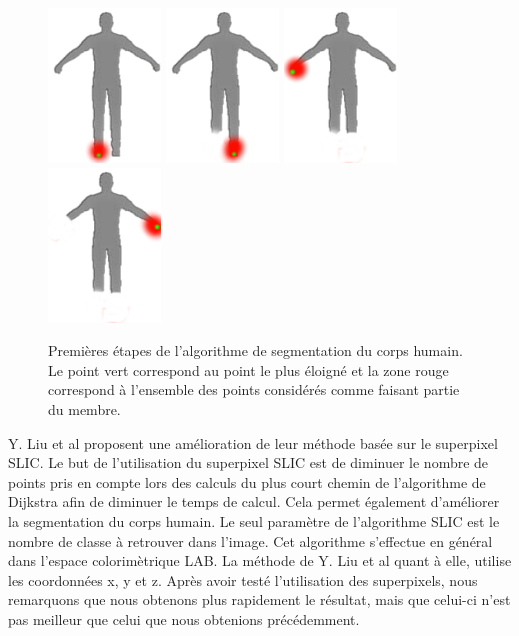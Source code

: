 \begin{figure}[!ht]
  \begin{center}
    \includegraphics[width=3cm]{image/humanFootR.png}
    \includegraphics[width=3cm]{image/humanFootL.png}
    \includegraphics[width=3cm]{image/humanHandR.png}
    \includegraphics[width=3cm]{image/humanHandL.png}
    \caption{Premières étapes de l'algorithme de segmentation du corps humain. Le point vert correspond au point le plus éloigné et la zone rouge correspond à
    l'ensemble des points considérés comme faisant partie du membre.}
    \label{fig:segmentation}
  \end{center}
\end{figure}

Y. Liu et al\cite{GIF} proposent une amélioration de leur méthode basée sur le superpixel SLIC\cite{SLIC}. Le but de l'utilisation du superpixel
SLIC est de diminuer le nombre de points pris en compte lors des calculs du plus court chemin de l'algorithme de Dijkstra afin de diminuer le 
temps de calcul. Cela permet également d'améliorer la segmentation du corps humain. Le seul paramètre de l'algorithme SLIC est le nombre de classe à 
retrouver dans l'image. Cet algorithme s'effectue en général dans l'espace colorimètrique LAB. La méthode de Y. Liu et al\cite{GIF} quant à
elle, utilise les coordonnées x, y et z. Après avoir testé l'utilisation des superpixels, nous remarquons que nous obtenons plus rapidement le résultat,
mais que celui-ci n'est pas meilleur que celui que nous obtenions précédemment.\\

